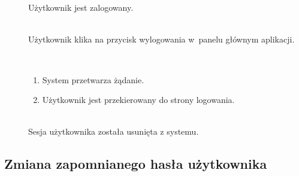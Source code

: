 \documentclass[11pt]{aghdpl}
\begin{document}
	\begin{description}
		\item[\useCaseAktor] \hfill \\
			\useCaseUzytkownik
		\item[\useCaseWarPocz] \hfill \\
			Użytkownik jest zalogowany.
		\item[\useCaseZdarzInicj] \hfill \\
			Użytkownik klika na przycisk wylogowania w~panelu głównym aplikacji.
		\item[\useCaseScenBaz] \hfill \\ 
			\begin{enumerate}
			\item System przetwarza żądanie.
			\item Użytkownik jest przekierowany do strony logowania.
			\end{enumerate}
		\item[\useCaseWarKonc] \hfill \\ 
			Sesja użytkownika została usunięta z systemu.
	\end{description}

\subsection{Zmiana zapomnianego hasła użytkownika}
\end{document}
